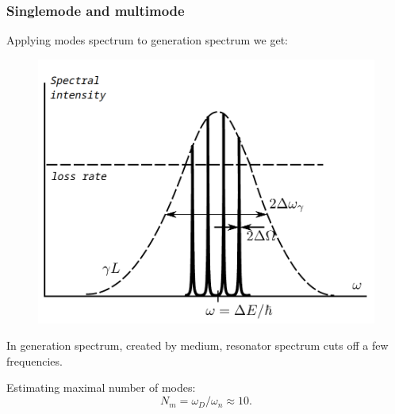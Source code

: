 \documentclass{beamer}
\begin{document}
	\begin{frame}
		\frametitle{Singlemode and multimode}
		
		Applying modes spectrum to generation spectrum we get:
		
		\begin{figure}
			\centering
			\includegraphics[width=0.6\linewidth]{res/overall_spectrum.png}
		\end{figure}
	
		In generation spectrum, created by medium, resonator spectrum cuts off a few frequencies.
		
		Estimating maximal number of modes:
		$$ N_m = \omega_D / \omega_n \approx 10.$$
	\end{frame}
\end{document}
